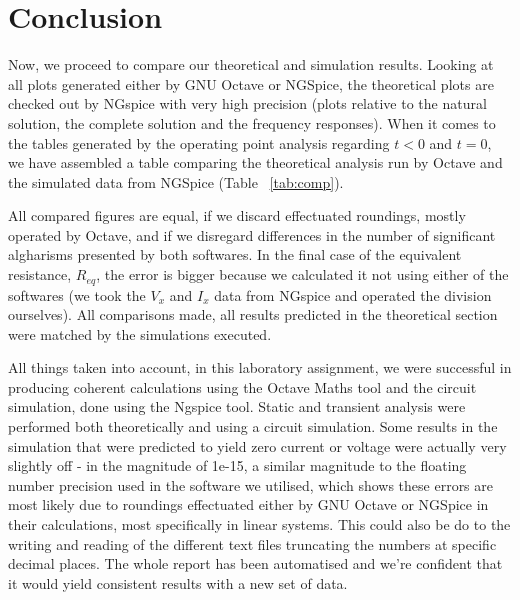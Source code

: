 \newpage
\section{Conclusion}
\label{sec:conclusion}

Now, we proceed to compare our theoretical and simulation results. Looking at all plots generated either by GNU Octave or NGSpice, the theoretical plots are checked out by NGspice with very high precision (plots relative to the natural solution, the complete solution and the frequency responses). When it comes to the tables generated by the operating point analysis regarding $t<0$ and $t=0$, we have assembled a table comparing the theoretical analysis run by Octave and the simulated data from NGSpice (Table ~\ref{tab:comp}).

All compared figures are equal, if we discard effectuated roundings, mostly operated by Octave, and if we disregard differences in the number of significant algharisms presented by both softwares. In the final case of the equivalent resistance, $R_{eq}$, the error is bigger because we calculated it not using either of the softwares (we took the $V_{x}$ and $I_{x}$ data from NGspice and operated the division ourselves).
All comparisons made, all results predicted in the theoretical section were matched by the simulations executed.

All things taken into account, in this laboratory assignment, we were successful in producing coherent calculations using the Octave Maths tool and the circuit simulation, done using the Ngspice tool. Static and transient analysis were performed both theoretically and using a circuit simulation. Some results in the simulation that were predicted to yield zero current or voltage were actually very slightly off - in the magnitude of 1e-15, a similar magnitude to the floating number precision used in the software we utilised, which shows these errors are most likely due to roundings effectuated either by GNU Octave or NGSpice in their calculations, most specifically in linear systems. This could also be do to the writing and reading of the different text files truncating the numbers at specific decimal places. The whole report has been automatised and we're confident that it would yield consistent results with a new set of data.
